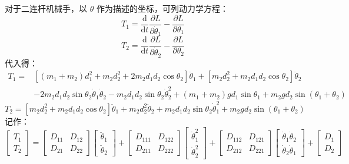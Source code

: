 对于二连杆机械手，以 $\theta$ 作为描述的坐标，可列动力学方程：
$$T_{1} = \frac{\mathrm{d}}{\mathrm{d}t}\frac{\partial L}{\partial\dot{\theta}_{1}} - \frac{\partial L}{\partial\theta_{1}}$$
$$T_{2} = \frac{\mathrm{d}}{\mathrm{d}t}\frac{\partial L}{\partial\dot{\theta}_{2}} - \frac{\partial L}{\partial\theta_{2}}$$
代入得：
$$
\begin{aligned}
    T_{1} =& [(m_{1}+m_{2})d_{1}^{2} + m_{2}d_{2}^{2} + 2m_{2}d_{1}d_{2}\cos\theta_{2}]\ddot{\theta}_{1} + [m_{2}d_{2}^{2} + m_{2}d_{1}d_{2}\cos\theta_{2}]\ddot{\theta}_{2} \\
    &- 2m_{2}d_{1}d_{2}\sin\theta_{2}\dot{\theta}_{1}\dot{\theta}_{2} - m_{2}d_{1}d_{2}\sin\theta_{2}\dot{\theta}_{2}^{2} + (m_{1}+m_{2})g d_{1}\sin\theta_{1} + m_{2}g d_{2}\sin(\theta_{1}+\theta_{2})
\end{aligned}
$$
$$T_{2} = [m_{2}d_{2}^{2} + m_{2}d_{1}d_{2}\cos\theta_{2}]\ddot{\theta}_{1} + m_{2}d_{2}^{2}\ddot{\theta}_{2} + m_{2}d_{1}d_{2}\sin\theta_{2}\dot{\theta}_{1}^{2} + m_{2}g d_{2}\sin(\theta_{1}+\theta_{2})$$
记作：
$$\begin{bmatrix} T_{1} \\ T_{2} \end{bmatrix} = \begin{bmatrix} D_{11} & D_{12} \\ D_{21} & D_{22} \end{bmatrix} \begin{bmatrix} \ddot{\theta}_{1} \\ \ddot{\theta}_{2} \end{bmatrix} + \begin{bmatrix} D_{111} & D_{122} \\ D_{211} & D_{222} \end{bmatrix} \begin{bmatrix} \dot{\theta}_{1}^{2} \\ \dot{\theta}_{2}^{2} \end{bmatrix} + \begin{bmatrix} D_{112} & D_{121} \\ D_{212} & D_{221} \end{bmatrix} \begin{bmatrix} \dot{\theta}_{1}\dot{\theta}_{2} \\ \dot{\theta}_{2}\dot{\theta}_{1} \end{bmatrix} + \begin{bmatrix} D_{1} \\ D_{2} \end{bmatrix}$$

